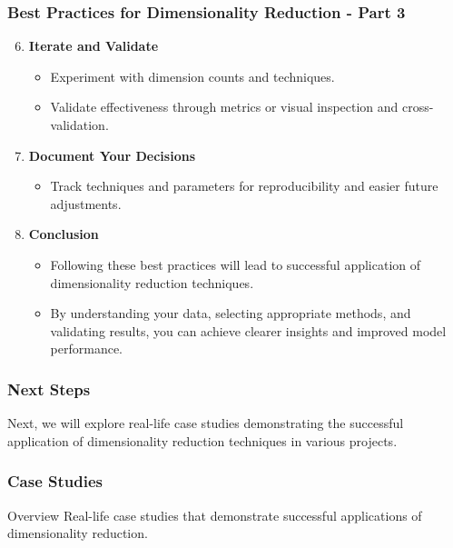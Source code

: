 \documentclass[aspectratio=169]{beamer}
\begin{document}
\begin{frame}[fragile]
    \frametitle{Best Practices for Dimensionality Reduction - Part 3}
    \begin{enumerate}
        \setcounter{enumi}{5}
        \item \textbf{Iterate and Validate}
        \begin{itemize}
            \item Experiment with dimension counts and techniques.
            \item Validate effectiveness through metrics or visual inspection and cross-validation.
        \end{itemize}

        \item \textbf{Document Your Decisions}
        \begin{itemize}
            \item Track techniques and parameters for reproducibility and easier future adjustments.
        \end{itemize}

        \item \textbf{Conclusion}
        \begin{itemize}
            \item Following these best practices will lead to successful application of dimensionality reduction techniques.
            \item By understanding your data, selecting appropriate methods, and validating results, you can achieve clearer insights and improved model performance.
        \end{itemize}
    \end{enumerate}
\end{frame}

\begin{frame}[fragile]
    \frametitle{Next Steps}
    Next, we will explore real-life case studies demonstrating the successful application of dimensionality reduction techniques in various projects.
\end{frame}

\begin{frame}[fragile]
    \frametitle{Case Studies}
    \begin{block}{Overview}
        Real-life case studies that demonstrate successful applications of dimensionality reduction.
    \end{block}
\end{frame}
\end{document}
